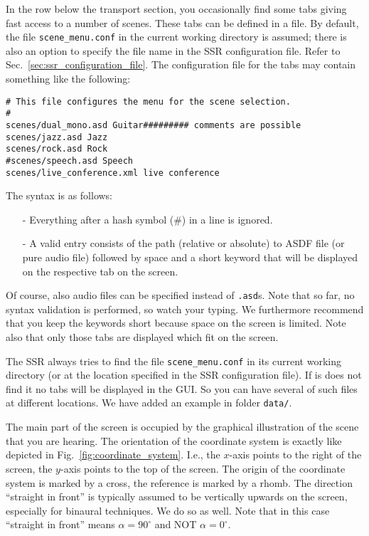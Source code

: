 In the row below the transport section, you occasionally find some tabs giving
fast access to a number of scenes. These tabs can be defined in a file. By 
default, the file \texttt{scene\_menu.conf} in the current working directory is
assumed; there is also an option to specify the file name in the SSR 
configuration file. Refer to Sec.~\ref{sec:ssr_configuration_file}. The 
configuration file for the tabs may contain something like the following:
%
\begin{verbatim}
# This file configures the menu for the scene selection.
#
scenes/dual_mono.asd Guitar######### comments are possible
scenes/jazz.asd Jazz
scenes/rock.asd Rock
#scenes/speech.asd Speech
scenes/live_conference.xml live conference
\end{verbatim}
%
The syntax is as follows:
\begin{itemize}
\item[-] Everything after a hash symbol (\#) in a line is ignored.
\item[-] A valid entry consists of the path (relative or absolute)
to ASDF file (or pure audio file) followed by space and a short
keyword that will be displayed on the respective tab on the screen.
\end{itemize}
%
Of course, also audio files can be specified instead of \texttt{.asd}s. Note
that so far, no syntax validation is performed, so watch your typing. We
furthermore recommend that you keep the keywords short because space on the
screen is limited. Note also that only those tabs are displayed which fit on
the screen.

The SSR always tries to find the file \texttt{scene\_menu.conf} in its current
working directory (or at the location specified in the SSR configuration file). 
If is does not find it no tabs will be displayed in the GUI.
So you can have several of such files at different locations. We have added an
example in folder \texttt{data/}.

The main part of the screen is occupied by the graphical
illustration of the scene that you are hearing. The orientation of the coordinate
system is exactly like depicted in Fig.~\ref{fig:coordinate_system}.
I.e., the $x$-axis points to the right of the screen, the $y$-axis points to the top
of the screen. The origin of the coordinate system is marked by a cross, the reference
is marked by a rhomb. The direction ``straight in front'' is typically assumed to be
vertically upwards on the screen, especially for binaural techniques. We do so as well.
Note that in this case ``straight in front'' means $\alpha = 90^\circ$ and NOT
$\alpha=0^\circ$.

